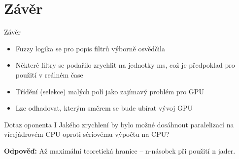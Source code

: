 \documentclass[compress,mathserif]{beamer}
\theoremstyle{definition}
\theoremstyle{plain}
\newcommand{\beI}{\begin{itemize}}
\newcommand{\enI}{\end{itemize}}
\begin{document}
\section{Závěr}
    \begin{frame}{Závěr}
      \beI
        \item Fuzzy logika se pro popis filtrů výborně osvědčila
        \item Některé filtry se podařilo zrychlit na jednotky ms, což je předpoklad pro použití v reálném čase
        \item Třídění (selekce) malých polí jako zajímavý problém pro GPU
        \item Lze odhadovat, kterým směrem se bude ubírat vývoj GPU
      \enI
    \end{frame}

    \begin{frame}{Dotaz oponenta I}
      Jakého zrychlení by bylo možné dosáhnout paralelizací na vícejádrovém CPU oproti sériovému výpočtu na CPU?

      \textbf{Odpověď:} Až maximální teoretická hranice -- n-násobek při použití n jader.
    \end{frame}
\end{document}
